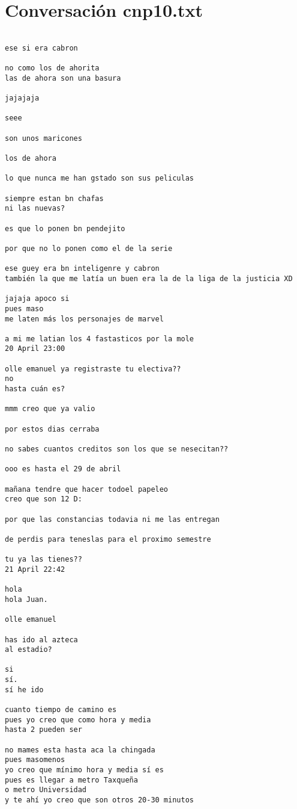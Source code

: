 \section{Conversaci\'on cnp10.txt}
\begin{verbatim}

ese si era cabron

no como los de ahorita
las de ahora son una basura

jajajaja

seee

son unos maricones

los de ahora

lo que nunca me han gstado son sus peliculas

siempre estan bn chafas
ni las nuevas?

es que lo ponen bn pendejito

por que no lo ponen como el de la serie

ese guey era bn inteligenre y cabron
también la que me latía un buen era la de la liga de la justicia XD

jajaja apoco si
pues maso
me laten más los personajes de marvel

a mi me latian los 4 fastasticos por la mole
20 April 23:00

olle emanuel ya registraste tu electiva??
no 
hasta cuán es?

mmm creo que ya valio

por estos dias cerraba

no sabes cuantos creditos son los que se nesecitan??

ooo es hasta el 29 de abril

mañana tendre que hacer todoel papeleo
creo que son 12 D:

por que las constancias todavia ni me las entregan

de perdis para teneslas para el proximo semestre

tu ya las tienes??
21 April 22:42

hola
hola Juan.

olle emanuel

has ido al azteca
al estadio?

si
sí.
sí he ido

cuanto tiempo de camino es
pues yo creo que como hora y media
hasta 2 pueden ser

no mames esta hasta aca la chingada
pues masomenos
yo creo que mínimo hora y media sí es
pues es llegar a metro Taxqueña
o metro Universidad
y te ahí yo creo que son otros 20-30 minutos



\end{verbatim}
